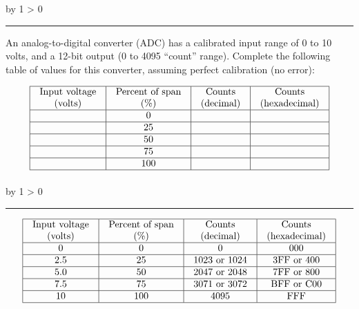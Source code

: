 \documentclass[12pt,a4paper]{article}
\def\oppgave{
            \advance\questnum by 1
            \ifnum \questnum > 0
                 \hrule
                 \vskip 3pt
                 \leftline{Oppgave \the\questnum}
                 \vskip 3pt \fi}
\def\svar{
           \advance\answnum by 1
           \ifnum \answnum > 0
                \hrule
                \vskip 3pt
                \leftline{Svar \the\answnum}
                \vskip 3pt \fi}
\begin{document}
\vfil \eject 



\oppgave{} 

An analog-to-digital converter (ADC) has a calibrated input range of 0 to 10 volts, and a 12-bit output (0 to 4095 ``count'' range).  Complete the following table of values for this converter, assuming perfect calibration (no error):


$$\vbox{\offinterlineskip
\halign{\strut
\vrule \quad\hfil # \ \hfil & 
\vrule \quad\hfil # \ \hfil & 
\vrule \quad\hfil # \ \hfil & 
\vrule \quad\hfil # \ \hfil \vrule \cr
\noalign{\hrule}
%
Input voltage & Percent of span & Counts & Counts \cr
%
(volts) & (\%) & (decimal) & (hexadecimal) \cr
%
\noalign{\hrule}
%
 & 0 &  & \cr
%
\noalign{\hrule}
%
 & 25 &  & \cr
%
\noalign{\hrule}
%
 & 50 &  & \cr
%
\noalign{\hrule}
%
 & 75 &  &  \cr
%
\noalign{\hrule}
%
 & 100 &  &  \cr
%
\noalign{\hrule}
} %
}$$ %

\vskip 10pt \filbreak 





\svar{} 


$$\vbox{\offinterlineskip
\halign{\strut
\vrule \quad\hfil # \ \hfil & 
\vrule \quad\hfil # \ \hfil & 
\vrule \quad\hfil # \ \hfil & 
\vrule \quad\hfil # \ \hfil \vrule \cr
\noalign{\hrule}
%
Input voltage & Percent of span & Counts & Counts \cr
%
(volts) & (\%) & (decimal) & (hexadecimal) \cr
%
\noalign{\hrule}
%
0 & 0 & 0 & 000 \cr
%
\noalign{\hrule}
%
2.5 & 25 & 1023 or 1024 & 3FF or 400 \cr
%
\noalign{\hrule}
%
5.0 & 50 & 2047 or 2048 & 7FF or 800 \cr
%
\noalign{\hrule}
%
7.5 & 75 & 3071 or 3072 & BFF or C00 \cr
%
\noalign{\hrule}
%
10 & 100 & 4095 & FFF \cr
%
\noalign{\hrule}
} %
}$$ %
\end{document}
